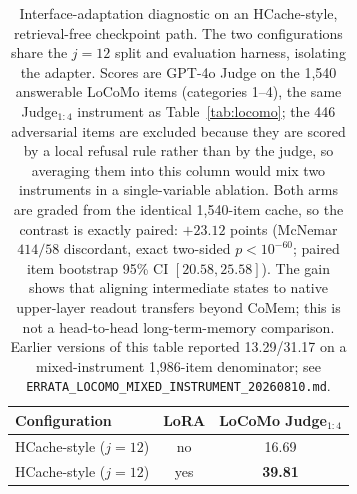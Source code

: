 \begin{table}[!t]
\centering
\small
\setlength{\tabcolsep}{5pt}
\begin{tabular}{@{}lcc@{}}
\toprule
\textbf{Configuration} & \textbf{LoRA} & \textbf{LoCoMo Judge$_{1:4}$} \\
\midrule
HCache-style ($j{=}12$) & no  & 16.69 \\
HCache-style ($j{=}12$) & yes & \textbf{39.81} \\
\bottomrule
\end{tabular}
\caption{Interface-adaptation diagnostic on an HCache-style, retrieval-free
checkpoint path. The two configurations share the $j{=}12$ split and evaluation
harness, isolating the adapter. Scores are GPT-4o Judge on the 1,540 answerable
LoCoMo items (categories 1--4), the same Judge$_{1:4}$ instrument as
Table~\ref{tab:locomo}; the 446 adversarial items are excluded because they are
scored by a local refusal rule rather than by the judge, so averaging them into
this column would mix two instruments in a single-variable ablation. Both arms
are graded from the identical 1,540-item cache, so the contrast is exactly
paired: $+23.12$ points (McNemar $414/58$ discordant, exact two-sided
$p<10^{-60}$; paired item bootstrap 95\% CI $[20.58,25.58]$). The gain shows
that aligning intermediate states to native upper-layer readout transfers beyond
CoMem; this is not a head-to-head long-term-memory comparison. Earlier versions
of this table reported 13.29/31.17 on a mixed-instrument 1,986-item
denominator; see \texttt{ERRATA\_LOCOMO\_MIXED\_INSTRUMENT\_20260810.md}.}
\label{tab:hcache-lora}
\end{table}